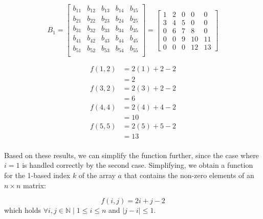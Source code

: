 \documentclass[12pt,letterpaper,final]{report}
\begin{document}
\begin{enumerate}
        \[
          B_1 =
          \begin{bmatrix}
            b_{11} & \boxed{b_{12}} & b_{13} & b_{14}         & b_{15}         \\
            b_{21} & b_{22}         & b_{23} & b_{24}         & b_{25}         \\
            b_{31} & \boxed{b_{32}} & b_{33} & b_{34}         & b_{35}         \\
            b_{41} & b_{42}         & b_{43} & \boxed{b_{44}} & b_{45}         \\
            b_{51} & b_{52}         & b_{53} & b_{54}         & \boxed{b_{55}} \\
          \end{bmatrix}
          =
          \begin{bmatrix}
            1 & \boxed{2} & 0 & 0          & 0          \\
            3 & 4         & 5 & 0          & 0          \\
            0 & \boxed{6} & 7 & 8          & 0          \\
            0 & 0         & 9 & \boxed{10} & 11         \\
            0 & 0         & 0 & 12         & \boxed{13}
          \end{bmatrix}
        \]

        \begin{align*}
          f(1,2) & = 2(1) + 2 - 2 \\
                 & = 2            \\
          f(3,2) & = 2(3) + 2 - 2 \\
                 & = 6            \\
          f(4,4) & = 2(4) + 4 - 2 \\
                 & = 10           \\
          f(5,5) & = 2(5) + 5 - 2 \\
                 & = 13           \\
        \end{align*}

        Based on these results, we can simplify the function further, since the case where $i = 1$ is handled correctly by the second case. Simplifying, we obtain a function for the 1-based index $k$ of the array $a$ that contains the non-zero elements of an $n \times n$ matrix:

        \begin{equation}
          f(i,j) = 2i + j - 2
        \end{equation}
        which holds $\forall i, j \in \mathbb{N} \mid 1 \le i \le n$ and $|j - i| \le 1$.


\end{enumerate}
\end{document}

